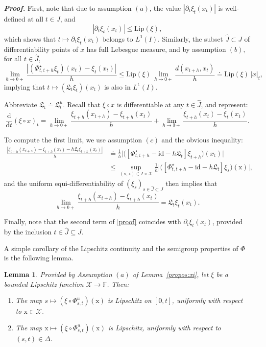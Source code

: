 \documentclass[sn-mathphys-num]{sn-jnl}
\numberwithin{equation}{section}
\theoremstyle{mythm}
\newtheorem{lemma}[proposition]{Lemma}
\theoremstyle{mydef}
\renewenvironment{proof}{\smallskip\noindent\emph{\textbf{Proof.}}%
  \hspace{1pt}}{\hspace{-5pt}{\nobreak\quad\nobreak\hfill\nobreak%
    $\square$\vspace{2pt}\par}\smallskip\goodbreak}
\newcommand{\Lip}{\mathrm{Lip}}
\newcommand{\id}{\mathrm{id}}
\begin{document}
\begin{proof}
    First, note that due to assumption $(a)$, the value \( |\partial_t \xi_t(x_t)| \) is well-defined at all \( t \in J \), and
    \[
        |\partial_t \xi_t(x_t)| \leq \Lip(\xi),
    \]
    which shows that \( t \mapsto \partial_t \xi_t(x_t) \) belongs to \( L^1(I) \). Similarly, the subset \( \hat{J} \subset J \) of differentiability points of \( x \) has full Lebesgue measure, and by assumption $(b)$, for all \( t \in \hat{J} \),
    \[
        \lim_{h \to 0+} \frac{\left| (\Phi^\star_{t, t+h} \xi_t)(x_t) - \xi_t(x_t) \right|}{h} \leq \Lip(\xi) \, \lim_{h \to 0+} \frac{d(x_{t+h}, x_t)}{h} \doteq \Lip(\xi) \, |\dot{x}|_t,
    \]
    implying that \( t \mapsto (\mathfrak{L}_t \xi_t)(x_t) \) is also in \( L^1(I) \).

    Abbreviate \( \mathfrak{L}_t \doteq \mathfrak{L}_t^u \). Recall that \( \xi \circ x \) is differentiable at any \( t \in \hat{J} \), and represent:
    \begin{equation}\label{proof}
        \frac{\mathrm{d}}{\mathrm{d}t} (\xi \circ x)_t  = \lim_{h \to 0+} \frac{\xi_{t+h}(x_{t+h}) - \xi_{t+h}(x_{t})}{h} + \lim_{h \to 0+} \frac{\xi_{t+h}(x_t) - \xi_t(x_t)}{h}.
    \end{equation}

To compute the first limit, we use assumption $(c)$ and the obvious inequality: 
\begin{align*}
    \frac{\left|\xi_{t+h}(x_{t+h}) - \xi_{t+h}(x_{t}) - h\mathfrak L_{t} \xi_{t+h}(x_{t})\right|}{h} & \doteq \frac{1}{h}\Big|\big(\left[\Phi^\star_{t, t+h}-\id - h\mathfrak L_t\right]\xi_{t+h}\big){(x_t)}\Big|\\
&\leq \sup_{(s, {\mathrm x})\in I \times \mathcal X}\frac{1}{h}\Big|\big(\left[\Phi^\star_{t, t+h}-\id - h\mathfrak L_t\right]\xi_{s}\big){{(\mathrm x)}}\Big|,
\end{align*}
and the uniform equi-differentiability of $(\xi_s)_{s \in \hat J \subset J}$ then implies that
\[
    \lim_{h \to 0+}\frac{\xi_{t+h}(x_{t+h}) - \xi_{t+h}(x_{t})}{h} =  \mathfrak L_{t} \xi_{t}(x_{t}).
\]

Finally, note that the second term of \eqref{proof} coincides with $\partial_t \xi_t(x_t)$, provided by the inclusion $t \in \hat J \subseteq J$.
\end{proof}

A simple corollary of the Lipschitz continuity and the semigroup properties of \(\Phi\) is the following lemma.  
\begin{lemma}\label{lem1}
  Provided by Assumption \((a)\) of Lemma~\ref{propos:xi}, let \(\xi\) be a bounded Lipschitz function \(\mathcal{X} \to \mathbb{F}\). Then:
\begin{enumerate}[(1)]
    \item The map \(s \mapsto (\xi \circ \Phi_{s,t}^{u})(\mathrm{x})\) is Lipschitz on \([0, t]\), uniformly with respect to \(\mathrm{x} \in \mathcal{X}\).
    \item The map \(\mathrm{x} \mapsto (\xi \circ \Phi_{s,t}^{u})(\mathrm{x})\) is Lipschitz, uniformly with respect to \((s, t) \in \Delta\).
\end{enumerate}
\end{lemma}
\end{document}
